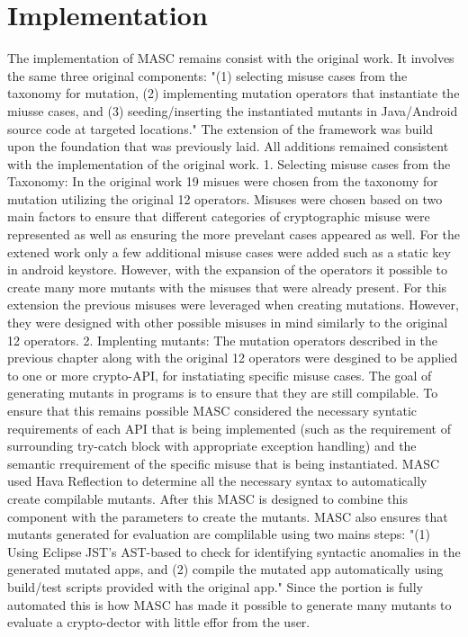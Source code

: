 \chapter{Implementation}
\label{chap_implementation}

The implementation of MASC remains consist with the original work. It involves the same three original components: "(1) selecting misuse cases from the taxonomy for mutation, (2) implementing mutation operators that instantiate the miusse cases, and (3) seeding/inserting the instantiated mutants in Java/Android source code at targeted locations." The extension of the framework was build upon the foundation that was previously laid. All additions remained consistent with the implementation of the original work.
1. Selecting misuse cases from the Taxonomy: In the original work 19 misues were chosen from the taxonomy for mutation utilizing the original 12 operators. Misuses were chosen based on two main factors to ensure that different categories of cryptographic misuse were represented as well as ensuring the more prevelant cases appeared as well. For the extened work only a few additional misuse cases were added such as a static key in android keystore. However, with the expansion of the operators it possible to create many more mutants with the misuses that were already present. For this extension the previous misuses were leveraged when creating mutations. However, they were designed with other possible misuses in mind similarly to the original 12 operators.
2. Implenting mutants: The mutation operators described in the previous chapter along with the original 12 operators were desgined to be applied to one or more crypto-API, for instatiating specific misuse cases. The goal of generating mutants in programs is to ensure that they are still compilable. To ensure that this remains possible MASC considered the necessary syntatic requirements of each API that is being implemented (such as the requirement of surrounding try-catch block with appropriate exception handling) and the semantic rrequirement of the specific misuse that is being instantiated. MASC used Hava Reflection to determine all the necessary syntax to automatically create compilable mutants. After this  MASC is designed to combine this component with the parameters to create the mutants.
MASC also ensures that mutants generated for evaluation are complilable using two mains steps: "(1) Using Eclipse JST's AST-based to check for identifying syntactic anomalies in the generated mutated apps, and (2) compile the mutated app automatically using build/test scripts provided with the original app." Since the portion is fully automated this is how MASC has made it possible to generate many mutants to evaluate a crypto-dector with little effor from the user.
